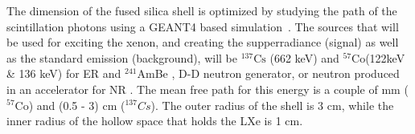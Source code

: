 The dimension of the fused silica shell is optimized by studying the path of the 
scintillation photons using a GEANT4 based simulation~\cite{AGOSTINELLI2003250}. 
The sources that will be used for exciting the xenon, and creating the supperradiance 
(signal) as well as the standard emission (background), will be $^{137} \mathrm{Cs}$ 
(662 keV) and $^{57} \mathrm{Co}$(122keV \& 136 keV) for ER and $^{241}$AmBe , 
D-D neutron generator, or neutron produced in an accelerator for NR . The mean 
free path for this energy is a couple of mm ($^{57} \mathrm{Co}$) and (0.5 - 3) 
cm ($^{137} Cs$).  The outer radius of the shell is 3 cm, while the inner radius of the 
hollow space that holds the LXe is 1 cm. 


